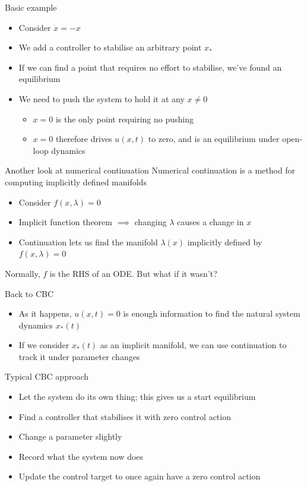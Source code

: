 \documentclass[presentation]{beamer}
\begin{document}
\begin{frame}[label={sec:org15f57a3}]{Basic example}
\begin{itemize}
\item Consider \(\dot{x} = -x\)
\item We add a controller to stabilise an arbitrary point \(x_*\)
\item If we can find a point that requires no effort to stabilise, we've found an equilibrium
\item We need to push the system to hold it at any \(x\neq0\)
\begin{itemize}
\item \(x=0\) is the only point requiring no pushing
\item \(x=0\) therefore drives \(u(x,t)\) to zero, and is an equilibrium under open-loop dynamics
\end{itemize}
\end{itemize}
\end{frame}

\begin{frame}[label={sec:org381ed59}]{Another look at numerical continuation}
Numerical continuation is a method for computing implicitly defined manifolds
\begin{itemize}
\item Consider \(f(x,\lambda)=0\)
\item Implicit function theorem \(\implies\) changing \(\lambda\) causes a change in \(x\)
\item Continuation lets us find the manifold \(\lambda(x)\) implicitly defined by \(f(x,\lambda)=0\)
\end{itemize}

Normally, \(f\) is the RHS of an ODE.
But what if it wasn't?
\end{frame}

\begin{frame}[label={sec:org727af82}]{Back to CBC}
\begin{itemize}
\item As it happens, \(u(x,t)=0\) is enough information to find the natural system dynamics \(x_*(t)\)
\item If we consider \(x_*(t)\) as an implicit manifold, we can use continuation to track it under parameter changes
\end{itemize}
\end{frame}

\begin{frame}[label={sec:orgbb7d87d}]{Typical CBC approach}
\begin{itemize}
\item Let the system do its own thing; this gives us a start equilibrium
\item Find a controller that stabilises it with zero control action
\item Change a parameter slightly
\item Record what the system now does
\item Update the control target to once again have a zero control action
\end{itemize}
\end{frame}
\end{document}

